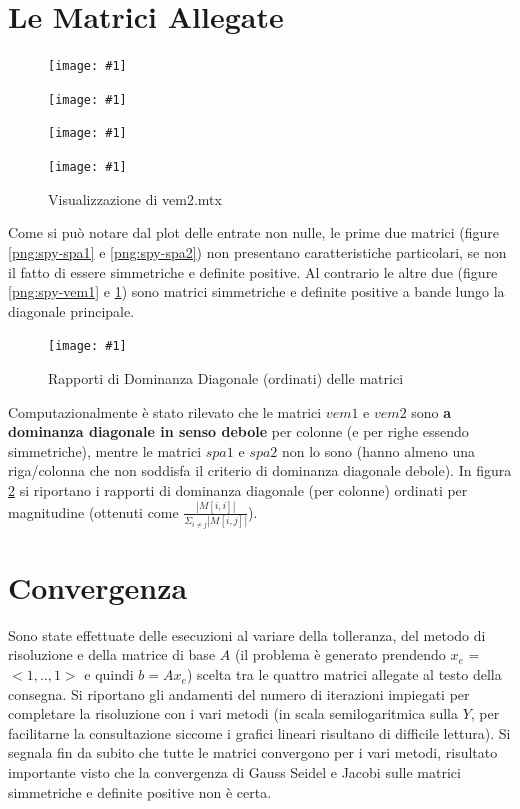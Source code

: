 \documentclass[a4paper,11pt,oneside, table]{article}
\newcommand{\putimage}[4] {
	\begin{figure}[H]
	    \centering
	    \texttt{[image: \#1]}
	    \caption{#2}\label{#3}
	\end{figure}
}
\newcommand{\putsubimage}[5] {
  \begin{minipage}{{#4}\linewidth}
	    \centering
      \texttt{[image: \#1]}
	    \caption{#2}\label{#3}
	\end{minipage}
}
\newcommand{\putimagequadruple}[4] {
  \begin{figure}[!htb]
      \centering
      #1
      \hspace{0.5cm}
      #2
      \linebreak
      #3
      \hspace{0.5cm}
      #4
  \end{figure}
}
\begin{document}
\pagebreak

\section{Le Matrici Allegate}

\putimagequadruple
  {\putsubimage{./images/spy-spa1.png}{Visualizzazione di spa1.mtx}{png:spy-spa1}{0.4}{0.99}}
  {\putsubimage{./images/spy-spa2.png}{Visualizzazione di spa2.mtx}{png:spy-spa2}{0.4}{0.99}}
  {\putsubimage{./images/spy-vem1.png}{Visualizzazione di vem1.mtx}{png:spy-vem1}{0.4}{0.99}}
  {\putsubimage{./images/spy-vem2.png}{Visualizzazione di vem2.mtx}{png:spy-vem2}{0.4}{0.99}}

Come si pu\`o notare dal plot delle entrate non nulle, le prime due matrici (figure \ref{png:spy-spa1} e \ref{png:spy-spa2}) non presentano caratteristiche particolari, se non il fatto di essere simmetriche e definite positive.
Al contrario le altre due (figure \ref{png:spy-vem1} e \ref{png:spy-vem2}) sono matrici simmetriche e definite positive a bande lungo la diagonale principale.

\putimage{./images/dominance.png}{Rapporti di Dominanza Diagonale (ordinati) delle matrici}{png:dominance}{0.9}

Computazionalmente \`e stato rilevato che le matrici $vem1$ e $vem2$ sono \textbf{a dominanza diagonale in senso debole} per colonne (e per righe essendo simmetriche), mentre le matrici $spa1$ e $spa2$ non lo sono (hanno almeno una riga/colonna che non soddisfa il criterio di dominanza diagonale debole).
In figura \ref{png:dominance} si riportano i rapporti di dominanza diagonale (per colonne) ordinati per magnitudine (ottenuti come $\frac {| M[i, i] |} {\Sigma _ {i \ne j} | M[i, j] |}$).

\section{Convergenza}

Sono state effettuate delle esecuzioni al variare della tolleranza, del metodo di risoluzione e della matrice di base $A$ (il problema \`e generato prendendo $x_e$ = $<1,.., 1>$ e quindi $b = Ax_e$) scelta tra le quattro matrici allegate al testo della consegna.
Si riportano gli andamenti del numero di iterazioni impiegati per completare la risoluzione con i vari metodi (in scala semilogaritmica sulla $Y$, per facilitarne la consultazione siccome i grafici lineari risultano di difficile lettura).
Si segnala fin da subito che tutte le matrici convergono per i vari metodi, risultato importante visto che la convergenza di Gauss Seidel e Jacobi sulle matrici simmetriche e definite positive non \`e certa.
\end{document}
